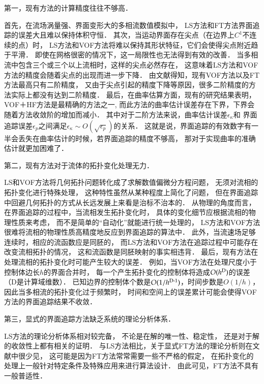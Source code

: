 第一，现有方法的计算精度往往不够高．

首先，在流场涡量强、界面变形大的多相流数值模拟中，
LS方法和FT方法界面追踪的误差大且难以保持体积守恒．
其次，当运动界面存在尖点（在边界上$C^1$不连续的点）时，
LS方法和VOF方法将难以保持其形状特征，它们会使得尖点附近趋于平滑．
即使在网格很密的情况下，这一局限性也无法得到有效的改善．
当多相流中包含三个或三个以上流相时，这样的尖点必然存在，
这意味着LS方法和VOF方法的精度会随着尖点的出现而进一步下降．
由文献\cite{zhang13:VOFadvection,zhang14:iPAM}得知，现有VOF方法以及FT方法最高只有二阶精度，
又由于尖点引起的精度下降等原因，很多二阶精度的方法实际上都没有达到二阶精度．
最后，在曲率估算方面，现有的研究\cite{cummins05,denner14:comparative}结果表明，
VOF＋HF方法\cite{helmsen97,sussman03}是最精确的方法之一,
而此方法的曲率估计误差存在下界，下界会随着方法收敛阶的增加而减小．
其中对于二阶方法来说，曲率估计误差$\epsilon_{\kappa}$和
界面追踪误差$\epsilon_p$之间满足$\epsilon_{\kappa}　\sim O(\sqrt{\epsilon_p})$的关系\cite{zhang17:_hfes}．
这就是说，界面追踪的有效数字有一半会丢失在曲率估计的时候，若界面追踪的精度不够高，
那对于实现曲率的准确估计就更加困难了．

第二，现有方法对于流体的拓扑变化处理无力．

LS和VOF方法将几何拓扑问题转化成了求解数值偏微分方程问题，
无须对流相的拓扑变化进行特殊处理，
这种特性虽然从某种程度上简化了问题，
但在界面追踪中回避几何拓扑的方式从长远发展上来看是治标不治本的．
从物理的角度而言，在界面追踪的过程中，当流相发生拓扑变化时，
具体的变化细节应根据流相的物理性质来考虑，
而不是简单的“自动化”就能进行统一处理的，
LS方法和VOF方法很难将流相的物理性质高精度地反应到界面追踪的算法中\cite{zhang14:iPAM}．
此外，当流速场足够连续时，相应的流函数应是同胚的，
而LS方法和VOF方法在追踪过程中可能存在改变流相拓扑的情况，
这和流函数是同胚映射的事实相违背．
最后，现有方法在处理流相的拓扑变化时可能产生较大的误差．
例如，当VOF方法在处理尺度小于控制体边长$h$的界面合并时，
每一个产生拓扑变化的控制体将造成$O(h^{\textup{D}})$的误差（D是计算域维数）．
已知边界的控制体个数是$O(1/h^{\textup{D-1}})$，时间步数是$O(1/h)$，
因此当多相流的拓扑变化过于频繁时，
时间和空间上的误差累计可能会使得VOF方法的界面追踪结果不收敛．

第三，显式的界面追踪方法缺乏系统的理论分析体系．

LS方法的理论分析体系相对较完备\cite{falcone14,giga06,sethian97}，
不论是在解的唯一性\cite{chen91,evans91,giga92}、稳定性，
还是对于解的收敛性\cite{barles91,crandall96,decknlnick00,falcone98,falcone01,walkington96}上都有相关的证明．
与LS方法相比，关于显式FT方法的理论分析则在文献中很少见，
这可能是因为FT方法常常需要一些不严格的假定，
在拓扑变化的处理上一般针对特定条件及特殊应用来进行算法设计．
由此可见，FT方法不具有一般普适性．


